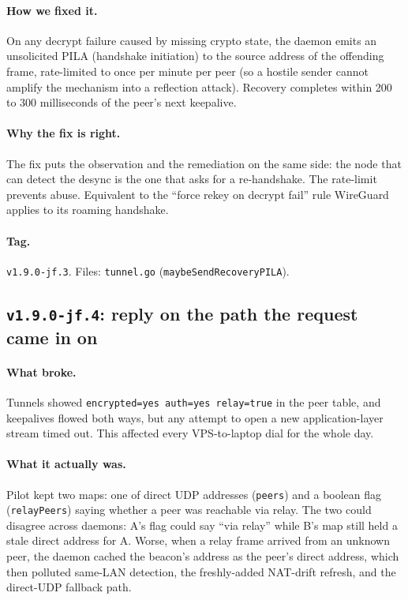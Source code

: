 \documentclass[11pt,a4paper]{article}
\begin{document}
\paragraph{How we fixed it.} On any decrypt failure caused by
missing crypto state, the daemon emits an unsolicited PILA
(handshake initiation) to the source address of the offending
frame, rate-limited to once per minute per peer (so a hostile
sender cannot amplify the mechanism into a reflection attack).
Recovery completes within 200 to 300 milliseconds of the peer's
next keepalive.

\paragraph{Why the fix is right.} The fix puts the observation
and the remediation on the same side: the node that can detect
the desync is the one that asks for a re-handshake. The
rate-limit prevents abuse. Equivalent to the ``force rekey on
decrypt fail'' rule WireGuard applies to its roaming handshake.

\paragraph*{Tag.} \texttt{v1.9.0-jf.3}. Files: \texttt{tunnel.go}
(\texttt{maybeSendRecoveryPILA}).

\subsection{\texttt{v1.9.0-jf.4}: reply on the path the request
came in on}

\paragraph{What broke.} Tunnels showed
\texttt{encrypted=yes auth=yes relay=true} in the peer table, and
keepalives flowed both ways, but any attempt to open a new
application-layer stream timed out. This affected every
VPS-to-laptop dial for the whole day.

\paragraph{What it actually was.} Pilot kept two maps: one of
direct UDP addresses (\texttt{peers}) and a boolean flag
(\texttt{relayPeers}) saying whether a peer was reachable via
relay. The two could disagree across daemons: A's flag could
say ``via relay'' while B's map still held a stale direct
address for A. Worse, when a relay frame arrived from an
unknown peer, the daemon cached the beacon's address as the
peer's direct address, which then polluted same-LAN detection,
the freshly-added NAT-drift refresh, and the direct-UDP fallback
path.
\end{document}
